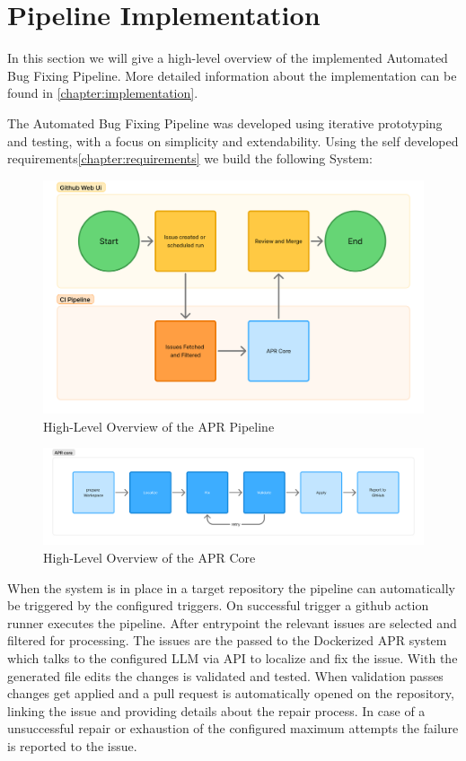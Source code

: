 \section{Pipeline Implementation}
In this section we will give a high-level overview of the implemented Automated Bug Fixing Pipeline. More detailed information about the implementation can be found in \ref{chapter:implementation}.

The Automated Bug Fixing Pipeline was developed using iterative prototyping and testing, with a focus on simplicity and extendability. Using the self developed requirements\ref{chapter:requirements} we build the following System:

\begin{figure}[H]
    \centering
    \includegraphics[width=1\textwidth]{images/flowcharts/high-level.png}
    \caption{High-Level Overview of the APR Pipeline}
    \label{fig:high-level}
\end{figure}

\begin{figure}[H]
    \centering
    \includegraphics[width=1\textwidth]{images/flowcharts/agent-core-high-level.png}
    \caption{High-Level Overview of the APR Core}
    \label{fig:apr-core-high-level}
\end{figure}

When the system is in place in a target repository the pipeline can automatically be triggered by the configured triggers. On successful trigger a github action runner executes the pipeline. After entrypoint the relevant issues are selected and filtered for processing. The issues are the passed to the Dockerized APR system which talks to the configured LLM via API to localize and fix the issue. With the generated file edits the changes is validated and tested. When validation passes changes get applied and a pull request is automatically opened on the repository, linking the issue and providing details about the repair process. In case of a unsuccessful repair or exhaustion of the configured maximum attempts the failure is reported to the issue.

